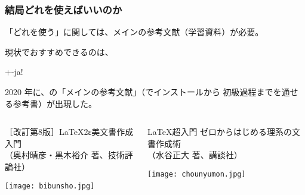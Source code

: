 \documentclass[aspectratio=149]{beamer}
\newcommand{\centeralign}[1]{\rule{0pt}{0pt}\hfill#1\hfill\rule{0pt}{0pt}}
\begin{document}
\begin{frame}
	\frametitle{結局どれを使えばいいのか}
	「どれを使う」に関しては、メインの参考文献（学習資料）が必要。
	
	現状でおすすめできるのは、\\
	\centeralign{{\LARGE\LuaLaTeX+\LuaTeX-ja!}}
	
	2020 年に、\LuaLaTeX の「メインの参考文献」（\LuaLaTeX でインストールから
	初級過程までを通せる参考書）が出現した。
	
	\begin{columns}
		\scriptsize
		\begin{column}[t]{.5\textwidth}
			［改訂第8版］LaTeX2ε美文書作成入門\\（奥村晴彦・黒木裕介 著、技術評論社）\\
			\centeralign{\texttt{[image: bibunsho.jpg]}}
		\end{column}
		\begin{column}[t]{.5\textwidth}
			\LaTeX 超入門 ゼロからはじめる理系の文書作成術\\（水谷正大 著、講談社）\\
			\centeralign{\texttt{[image: chounyumon.jpg]}}
		\end{column}
	\end{columns}
\end{frame}
\end{document}
